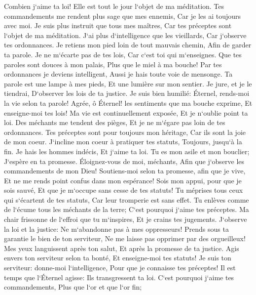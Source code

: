 \verse Combien j`aime ta loi! Elle est tout le jour l`objet de ma méditation. 
\verse Tes commandements me rendent plus sage que mes ennemis, Car je les ai toujours avec moi. 
\verse Je suis plus instruit que tous mes maîtres, Car tes préceptes sont l`objet de ma méditation. 
\verse J`ai plus d`intelligence que les vieillards, Car j`observe tes ordonnances. 
\verse Je retiens mon pied loin de tout mauvais chemin, Afin de garder ta parole. 
\verse Je ne m`écarte pas de tes lois, Car c`est toi qui m`enseignes. 
\verse Que tes paroles sont douces à mon palais, Plus que le miel à ma bouche! 
\verse Par tes ordonnances je deviens intelligent, Aussi je hais toute voie de mensonge. 
\verse Ta parole est une lampe à mes pieds, Et une lumière sur mon sentier. 
\verse Je jure, et je le tiendrai, D`observer les lois de ta justice. 
\verse Je suis bien humilié: Éternel, rends-moi la vie selon ta parole! 
\verse Agrée, ô Éternel! les sentiments que ma bouche exprime, Et enseigne-moi tes lois! 
\verse Ma vie est continuellement exposée, Et je n`oublie point ta loi. 
\verse Des méchants me tendent des pièges, Et je ne m`égare pas loin de tes ordonnances. 
\verse Tes préceptes sont pour toujours mon héritage, Car ils sont la joie de mon coeur. 
\verse J`incline mon coeur à pratiquer tes statuts, Toujours, jusqu`à la fin. 
\verse Je hais les hommes indécis, Et j`aime ta loi. 
\verse Tu es mon asile et mon bouclier; J`espère en ta promesse. 
\verse Éloignez-vous de moi, méchants, Afin que j`observe les commandements de mon Dieu! 
\verse Soutiens-moi selon ta promesse, afin que je vive, Et ne me rends point confus dans mon espérance! 
\verse Sois mon appui, pour que je sois sauvé, Et que je m`occupe sans cesse de tes statuts! 
\verse Tu méprises tous ceux qui s`écartent de tes statuts, Car leur tromperie est sans effet. 
\verse Tu enlèves comme de l`écume tous les méchants de la terre; C`est pourquoi j`aime tes préceptes. 
\verse Ma chair frissonne de l`effroi que tu m`inspires, Et je crains tes jugements. 
\verse J`observe la loi et la justice: Ne m`abandonne pas à mes oppresseurs! 
\verse Prends sous ta garantie le bien de ton serviteur, Ne me laisse pas opprimer par des orgueilleux! 
\verse Mes yeux languissent après ton salut, Et après la promesse de ta justice. 
\verse Agis envers ton serviteur selon ta bonté, Et enseigne-moi tes statuts! 
\verse Je suis ton serviteur: donne-moi l`intelligence, Pour que je connaisse tes préceptes! 
\verse Il est temps que l`Éternel agisse: Ils transgressent ta loi. 
\verse C`est pourquoi j`aime tes commandements, Plus que l`or et que l`or fin; 
